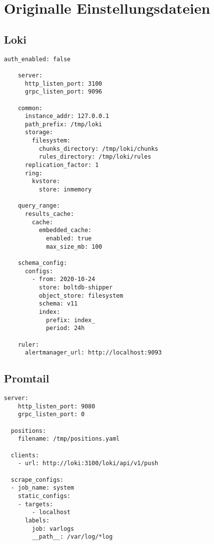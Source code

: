 \section{Originalle Einstellungsdateien}\label{appendix:orgGrafana}

\subsection{Loki}
{
\begin{Verbatim}[frame=single,fontsize=\small]
    auth_enabled: false

    server:
      http_listen_port: 3100
      grpc_listen_port: 9096
    
    common:
      instance_addr: 127.0.0.1
      path_prefix: /tmp/loki
      storage:
        filesystem:
          chunks_directory: /tmp/loki/chunks
          rules_directory: /tmp/loki/rules
      replication_factor: 1
      ring:
        kvstore:
          store: inmemory
    
    query_range:
      results_cache:
        cache:
          embedded_cache:
            enabled: true
            max_size_mb: 100
    
    schema_config:
      configs:
        - from: 2020-10-24
          store: boltdb-shipper
          object_store: filesystem
          schema: v11
          index:
            prefix: index_
            period: 24h
    
    ruler:
      alertmanager_url: http://localhost:9093
\end{Verbatim}
}

\subsection{Promtail}

{
\begin{Verbatim}[frame=single]
    server:
    http_listen_port: 9080
    grpc_listen_port: 0
  
  positions:
    filename: /tmp/positions.yaml
  
  clients:
    - url: http://loki:3100/loki/api/v1/push
  
  scrape_configs:
  - job_name: system
    static_configs:
    - targets:
        - localhost
      labels:
        job: varlogs
        __path__: /var/log/*log
  
\end{Verbatim}
}